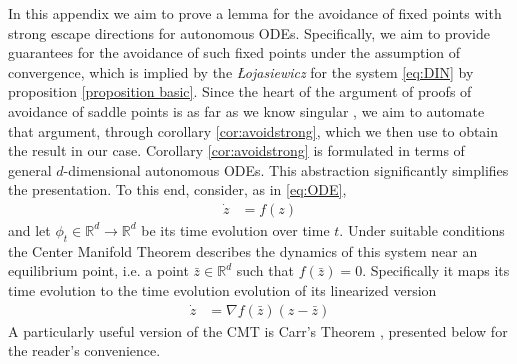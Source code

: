\documentclass[reqno]{amsart}
\theoremstyle{plain}
\theoremstyle{definition}
\theoremstyle{remark}
\begin{document}
In this appendix we aim to prove a lemma for the avoidance of fixed points with strong escape directions for autonomous ODEs.
Specifically, we aim to provide guarantees for the avoidance of such fixed points under the assumption of convergence, which is implied by the \textit{\L ojasiewicz} for the system \eqref{eq:DIN} by proposition \ref{proposition basic}. 
Since the heart of the argument of proofs of avoidance of saddle points is as far as we know singular \cite{PdM82,castera2023inertial,maulen2024inertial}, we aim to automate that argument, through corollary \ref{cor:avoidstrong}, which we then use to obtain the result in our case. 
Corollary \ref{cor:avoidstrong} is formulated in terms of general $d$-dimensional autonomous ODEs. 
This abstraction significantly simplifies the presentation. 
To this end, consider, as in \eqref{eq:ODE},
\begin{align}
\label{eq:ode}
	\dot{z} &= f(z) 
\end{align}
and let $\phi_t\in\mathbb{R}^{d}\to\mathbb{R}^{d}$ be its time evolution over time $t$.
Under suitable conditions the Center Manifold Theorem describes the dynamics of this system near an equilibrium point, i.e. a point $\bar{z}\in\mathbb{R}^d$ such that $f(\bar{z})=0$. Specifically it maps its time evolution to the time evolution evolution of its linearized version
\begin{align}
\dot{z} &= \nabla f (\bar{z}) (z-\bar{z})
\end{align}
A particularly useful version of the CMT is Carr's Theorem \cite{perko2013differential}, presented below for the reader's convenience. 
\end{document}
